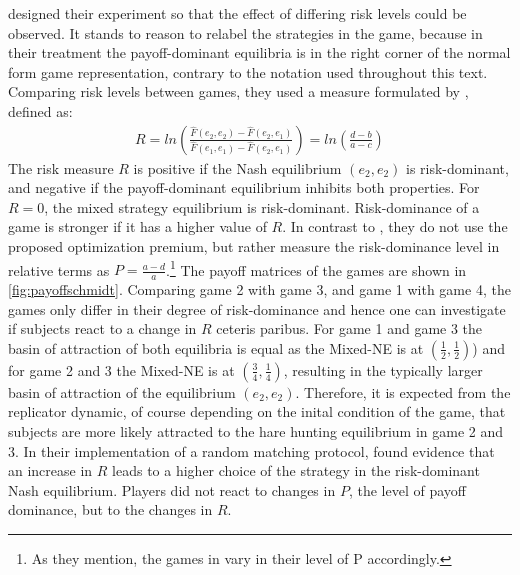 \textcite{schmidt_playing_2003} designed their experiment so that the effect
of differing risk levels could be observed. It stands to reason to relabel 
the strategies in the game, because in their treatment the payoff-dominant 
equilibria is in the right corner of the normal form game representation,
contrary to the notation used throughout this text. Comparing risk levels between
games, they used a measure formulated by \textcite{selten_axiomatic_1995}, 
defined
as:
\begin{align}
        \label{riskmeasureschmidt}
        R = ln\left(\frac{\hat{F}(e_2,e_2) -\hat{F}(e_2,e_1)}{\hat{F}(e_1,e_1) 
        -\hat{F}(e_2,e_1)}\right) = ln \left(\frac{d-b}{a-c}\right)
\end{align}
The risk measure $R$ is positive if the Nash equilibrium $(e_2,e_2)$ is
risk-dominant, and negative if the payoff-dominant equilibrium inhibits both
properties. For $R=0$, the mixed strategy equilibrium is risk-dominant.
Risk-dominance of a game is stronger if it has a higher value of $R$.
In contrast to \textcite{battalio_optimization_2001}, they do not
use the proposed optimization premium, but rather measure the risk-dominance 
level in relative terms as $P=\frac{a-d}{a}$.\footnote{As they mention, the 
games in \textcite{battalio_optimization_2001} vary in their level of 
P accordingly.}
The payoff matrices of the games are shown in \ref{fig:payoffschmidt}.
Comparing game 2 with game 3, and game 1 with game 4, the games
only differ in their degree of risk-dominance and hence one can 
investigate if subjects react to a change in $R$ ceteris paribus. 
For game 1 and game 3 the basin of attraction of both equilibria is equal as
the Mixed-NE is at $(\frac 12, \frac 12)$) and  for
game 2 and 3 the Mixed-NE is at $(\frac 34,\frac 14)$, resulting in the 
typically larger basin of attraction of the equilibrium $(e_2,e_2)$. 
Therefore, it is expected from the replicator dynamic, of course 
depending on the inital condition 
of the game, that subjects are more likely attracted to the hare hunting 
equilibrium in game 2 and 3. In their implementation of a 
random matching protocol, \textcite{schmidt_playing_2003} 
found evidence that an increase in $R$ leads to a higher choice 
of the strategy in the risk-dominant Nash equilibrium. Players did not react 
to changes in $P$, the level of payoff dominance, but to the changes in $R$.

